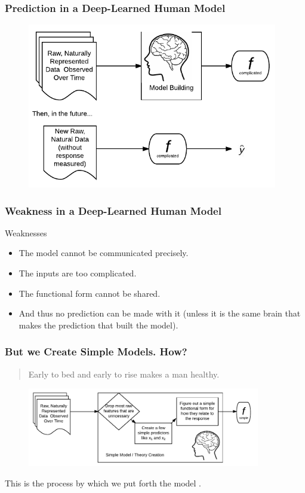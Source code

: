 \documentclass[slides]{beamer} %
\begin{document}
\begin{frame}\frametitle{Prediction in a Deep-Learned Human Model}


\begin{figure}
\centering
\includegraphics[width=4.3in]{human_learning_weakness}
\end{figure}

\end{frame}

\begin{frame}\frametitle{Weakness in a Deep-Learned Human Model}

\begin{block}{Weaknesses}
\begin{itemize}
\item The model cannot be communicated precisely. \pause 
\item The inputs are too complicated. \pause 
\item The functional form cannot be shared. \pause 
\item And thus no prediction can be made with it (unless it is the same brain that makes the prediction that built the model).
\end{itemize}
\end{block}


	
\end{frame}

\begin{frame}\frametitle{But we Create Simple Models. How?}

\begin{quotation}
Early to bed and early to rise makes a man healthy.
\end{quotation}

\begin{figure}
\centering
\includegraphics[width=4in]{human_simple_model_learning}
\end{figure}
 \pause 
This is the process by which we put forth the model .

\end{frame}
\end{document}
